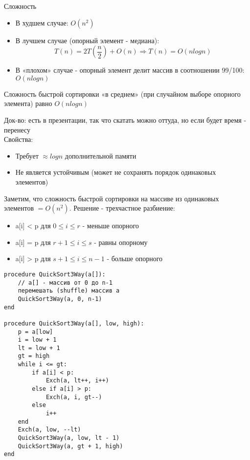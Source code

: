 \noindent Сложность
\begin{itemize}
    \item В худшем случае: $O(n^2)$
    \item В лучшем случае (опорный элемент - медиана):
    $$
    T(n) = 2T(\frac{n}{2})+ O(n) \Rightarrow T(n) = O(n log n)
    $$
    \item В «плохом» случае - опорный элемент делит массив в соотношении 99/100: $O(n log n)$
\end{itemize}

 Сложность быстрой сортировки «в среднем» (при случайном выборе опорного элемента) равно $O (n log n)$

\noindent Док-во: есть в презентации, так что скатать можно оттуда, но если будет время - перенесу \\

\noindent Свойства:
\begin{itemize}
    \item Требует $\approx log n$ дополнительной памяти
    \item Не является устойчивым (может не сохранять порядок одинаковых элементов)
\end{itemize}


\noindent Заметим, что сложность быстрой сортировки на массиве из одинаковых элементов $= O(n^2)$. Решение - трехчастное разбиение:
\begin{itemize}
    \item a[i] < p для $0 \le i\le r$ - меньше опорного
    \item a[i] = p для $r + 1 \le i \le s$ - равны опорному
    \item a[i] > p для $s + 1 \le i \le n - 1$ - больше опорного
\end{itemize}

\begin{verbatim}
procedure QuickSort3Way(a[]):
    // a[] - массив от 0 до n-1
    перемешать (shuffle) массив a
    QuickSort3Way(a, 0, n-1)
end

procedure QuickSort3Way(a[], low, high):
    p = a[low]
    i = low + 1
    lt = low + 1
    gt = high
    while i <= gt:
        if a[i] < p:
            Exch(a, lt++, i++)
        else if a[i] > p:
            Exch(a, i, gt--)
        else
            i++
    end
    Exch(a, low, --lt)
    QuickSort3Way(a, low, lt - 1)
    QuickSort3Way(a, gt + 1, high)
end
\end{verbatim}

